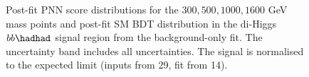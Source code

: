 \begin{figure}
 \quad
\caption{Post-fit PNN score distributions for the $300, 500, 1000, 1600$ GeV mass points and post-fit SM BDT distribution in the di-Higgs $bb\hadhad$ signal region from the \hadhad background-only fit. The uncertainty band includes all uncertainties. The signal is normalised to the expected limit (inputs from 29, fit from 14).}
\label{fig:HadHadPostfitPNNScoreDistributions}
\end{figure}


